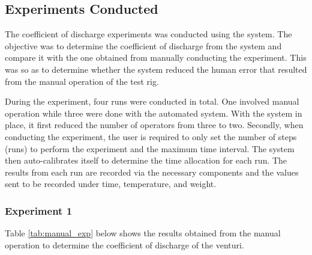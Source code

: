 \subsection{Experiments Conducted}

The coefficient of discharge experiments was conducted using the system. The objective was to determine the coefficient of discharge from the system and compare it with the one obtained from manually conducting the experiment. This was so as to determine whether the system reduced the human error that resulted from the manual operation of the test rig. 
\par
During the experiment, four runs were conducted in total. One involved manual operation while three were done with the automated system.  With the system in place, it first reduced the number of operators from three to two. Secondly, when conducting the experiment, the user is required to only set the number of steps (runs) to perform the experiment and the maximum time interval. The system then auto-calibrates itself to determine the time allocation for each run. The results from each run are recorded via the necessary components and the values sent to be recorded under time, temperature, and weight. 
\subsubsection{Experiment 1}
Table \ref{tab:manual_exp} below shows the results obtained from the manual operation to determine the coefficient of discharge of the venturi.

